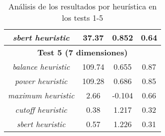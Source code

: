 \documentclass{article}
\begin{document}
\begin{table}[H]
{\begin{tabular}{|c|c|c|c|}
\textit{sbert heuristic} & 37.37 & 0.852 & 0.64 \\ \hline
\multicolumn{4}{|c|}{\textbf{Test 5 (7 dimensiones)}} \\ \hline
\textit{balance heuristic} & 109.74 & 0.655 & 0.87 \\ \hline
\textit{power heuristic} & 109.28 & 0.686 & 0.85 \\ \hline
\textit{maximum heuristic} & 2.66 & -0.104 & 0.66 \\ \hline
\textit{cutoff heuristic} & 0.38 & 1.217 & 0.32 \\ \hline
\textit{sbert heuristic} & 0.57 & 1.226 & 0.31 \\ \hline
\end{tabular}%
}
\caption{Análisis de los resultados por heurística en los tests 1-5}
\end{table}
\end{document}
